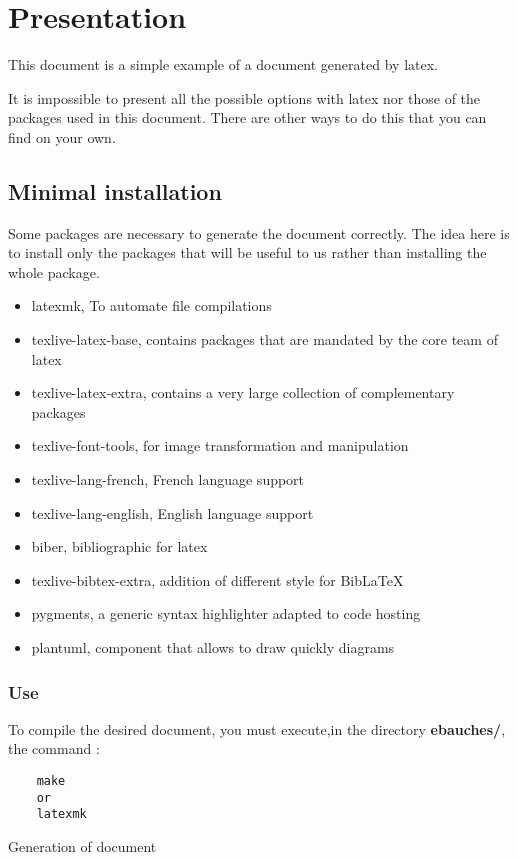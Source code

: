 \section{Presentation}
This document is a simple example of a document generated by \gls{latex}. \newline

It is impossible to present all the possible options with \gls{latex} nor those of the packages used
in this document.
There are other ways to do this that you can find on your own.

\subsection{Minimal installation}
Some packages are necessary to generate the document correctly.
The idea here is to install only the packages that will be useful to us rather than installing the whole package.
\begin{itemize}
    \item latexmk, To automate file compilations
    \item texlive-latex-base, contains packages that are mandated by the core team of \gls{latex}
    \item texlive-latex-extra, contains a very large collection of complementary packages
    \item texlive-font-tools, for image transformation and manipulation
    \item texlive-lang-french, French language support
    \item texlive-lang-english, English language support
    \item biber, bibliographic for \gls{latex}
    \item texlive-bibtex-extra, addition of different style for BibLaTeX
    \item pygments, a generic syntax highlighter adapted to code hosting
    \item plantuml, component that allows to draw quickly diagrams
\end{itemize}

\subsubsection{Use}
To compile the desired document, you must execute,in the directory \textbf{ebauches/}, the command :
\begin{code}
    \begin{verbatim}
    make
    or
    latexmk
\end{verbatim}
    \caption{Generation of document}
\end{code}

